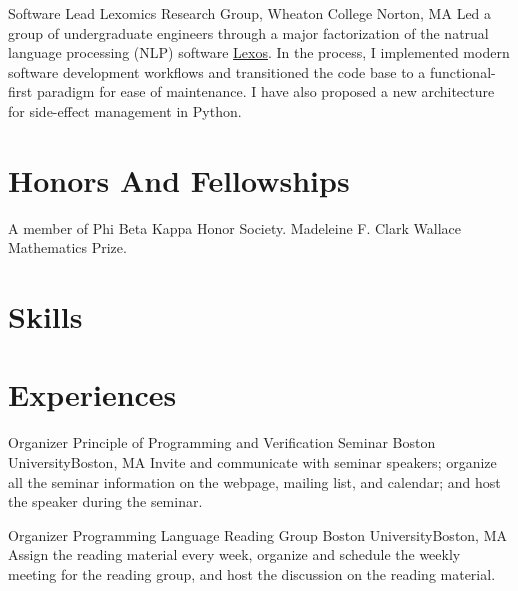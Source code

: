 \documentclass[11pt,roman]{moderncv}        %
\begin{document}
{Software Lead}
{Lexomics Research Group, Wheaton College}
{Norton, MA}{}
{
  Led a group of undergraduate engineers through a major factorization of 
  the natrual language processing (NLP) software 
  \href{https://github.com/WheatonCS/Lexos}{Lexos}.
  In the process, I implemented modern software development workflows and
  transitioned the code base to a functional-first paradigm for ease of maintenance.
  I have also proposed a new architecture for side-effect management in Python.
}


\section{Honors And Fellowships}
 {A member of Phi Beta Kappa Honor Society.}
 { Madeleine F. Clark Wallace Mathematics Prize.}


\section{Skills}


\section{Experiences}

{Organizer}
{Principle of Programming and Verification Seminar}
{Boston University}{Boston, MA}
{Invite and communicate with seminar speakers;
organize all the seminar information on the webpage, mailing list, and calendar;
and host the speaker during the seminar.}

{Organizer}
{Programming Language Reading Group}
{Boston University}{Boston, MA}
{Assign the reading material every week,
organize and schedule the weekly meeting for the reading group,
and host the discussion on the reading material.}
\end{document}
